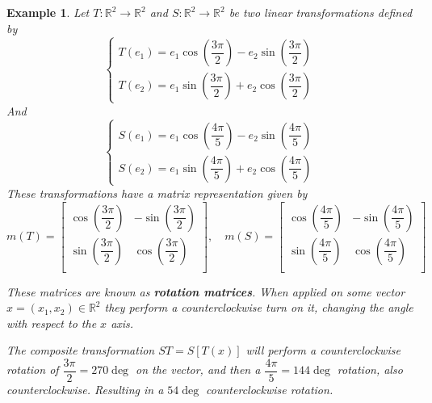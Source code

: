 \documentclass{book}
\newtheorem{example}{Example}[section]
\begin{document}
\begin{example}
    Let $T: \mathbb{R}^{2} \to \mathbb{R}^{2}$ and $S: \mathbb{R}^{2} \to \mathbb{R}^{2}$ be two linear
    transformations defined by
    \begin{equation*}
        \begin{cases}
            T(e_1) = e_1 \cos\left(\dfrac{3 \pi}{2}\right) - e_2 \sin\left(\dfrac{3 \pi}{2}\right) \\
            T(e_2) = e_1 \sin\left(\dfrac{3 \pi}{2}\right) + e_2 \cos\left(\dfrac{3 \pi}{2}\right)
        \end{cases}
    \end{equation*}
    And
    \begin{equation*}
        \begin{cases}
            S(e_1) = e_1 \cos\left(\dfrac{4 \pi}{5}\right) - e_2 \sin\left(\dfrac{4 \pi}{5}\right) \\
            S(e_2) = e_1 \sin\left(\dfrac{4 \pi}{5}\right) + e_2 \cos\left(\dfrac{4 \pi}{5}\right)
        \end{cases}
    \end{equation*}
    These transformations have a matrix representation given by
    \begin{equation*}
        m(T)=\left[\begin{matrix}
                \cos\left(\dfrac{3 \pi}{2}\right) & - \sin\left(\dfrac{3 \pi}{2}\right) \\[1.5em]
                \sin\left(\dfrac{3 \pi}{2}\right) & \cos\left(\dfrac{3 \pi}{2}\right)   \\
            \end{matrix}\right],\quad
        m(S)=\left[\begin{matrix}
                \cos\left(\dfrac{4 \pi}{5}\right) & - \sin\left(\dfrac{4 \pi}{5}\right) \\[1.5em]
                \sin\left(\dfrac{4 \pi}{5}\right) & \cos\left(\dfrac{4 \pi}{5}\right)   \\
            \end{matrix}\right]
    \end{equation*}

    These matrices are known as \textbf{rotation matrices}. When applied on some
    vector $x = \left(x_1,x_2\right)\in\mathbb{R}^{2}$ they perform a
    counterclockwise turn on it, changing the angle with respect to the $x$ axis.

    The composite transformation $ST = S\left[T(x)\right]$ will perform a
    counterclockwise rotation of $\dfrac{3\pi}{2} = 270\deg$ on the vector, and
    then a $\dfrac{4\pi}{5} = 144\deg$ rotation, also counterclockwise. Resulting
    in a $54\deg$ counterclockwise rotation.


\end{example}
\end{document}
